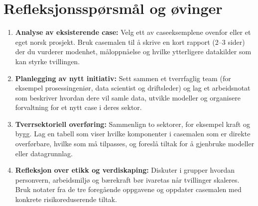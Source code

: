 \section{Refleksjonsspørsmål og øvinger}
\begin{enumerate}
    \item \textbf{Analyse av eksisterende case:} Velg ett av caseeksemplene ovenfor eller et eget norsk prosjekt. Bruk casemalen til å skrive en kort rapport (2--3 sider) der du vurderer modenhet, måloppnåelse og hvilke ytterligere datakilder som kan styrke tvillingen.
    \item \textbf{Planlegging av nytt initiativ:} Sett sammen et tverrfaglig team (for eksempel prosessingeniør, data scientist og driftsleder) og lag et arbeidsnotat som beskriver hvordan dere vil samle data, utvikle modeller og organisere forvaltning for et nytt case i deres sektor.
    \item \textbf{Tverrsektoriell overføring:} Sammenlign to sektorer, for eksempel kraft og bygg. Lag en tabell som viser hvilke komponenter i casemalen som er direkte overførbare, hvilke som må tilpasses, og foreslå tiltak for å gjenbruke modeller eller datagrunnlag.
    \item \textbf{Refleksjon over etikk og verdiskaping:} Diskuter i grupper hvordan personvern, arbeidsmiljø og bærekraft bør ivaretas når tvillinger skaleres. Bruk notater fra de tre foregående oppgavene og oppdater casemalen med konkrete risikoreduserende tiltak.
\end{enumerate}

